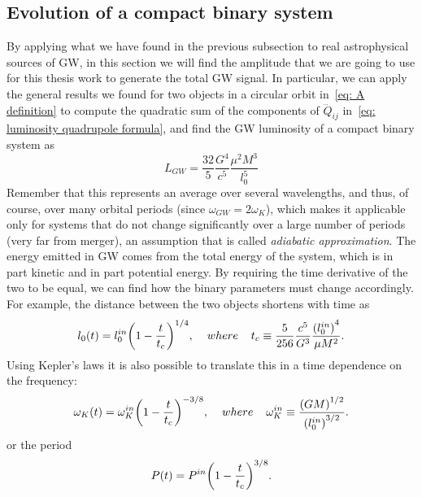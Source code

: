 \subsection{Evolution of a compact binary system}
By applying what we have found in the previous subsection to real astrophysical sources of GW, in this section we will find the amplitude that we are going to use for this thesis work to generate the total GW signal.
In particular, we can apply the general results we found for two objects in a circular orbit in~\eqref{eq: A definition} to compute the quadratic sum of the components of $\dddot{Q}_{ij}$ in~\eqref{eq: luminosity quadrupole formula}, and find the GW luminosity of a compact binary system as
\[
    L_{GW}=\frac{32}{5}\frac{G^4}{c^5}\frac{\mu^2 M^3}{l_0^5}
\]
Remember that this represents an average over several wavelengths, and thus, of course, over many orbital periods (since $\omega_{GW}=2\omega_K$), which makes it applicable only for systems that do not change significantly over a large number of periods (very far from merger), an assumption that is called \textit{adiabatic approximation}.
The energy emitted in GW comes from the total energy of the system, which is in part kinetic and in part potential energy. 
By requiring the time derivative of the two to be equal, we can find how the binary parameters must change accordingly. 
For example, the distance between the two objects shortens with time as
\begin{equation}
    l_0(t) = l_0^{in}{\left(1-\frac{t}{t_c}\right)}^{1/4},\hspace{4mm} where\hspace{4mm}    t_c\equiv \frac{5}{256}\frac{c^5}{G^3}\frac{{(l_0^{in})}^4}{\mu M^2}.
    \label{eq: l_0 time variation}
\end{equation}
Using Kepler's laws it is also possible to translate this in a time dependence on the frequency:
\begin{equation}
    \omega_K(t) = \omega_K^{in}{\left(1-\frac{t}{t_c}\right)}^{-3/8}, \hspace{4mm} where\hspace{4mm}\omega_K^{in} \equiv \frac{{(GM)}^{1/2}}{{(l_0^{in})}^{3/2}}.
    \label{eq: omega_K time variation}
\end{equation}
or the period
\begin{equation}
    P(t) = P^{in}{\left(1-\frac{t}{t_c}\right)}^{3/8}.
    \notag
\end{equation}

